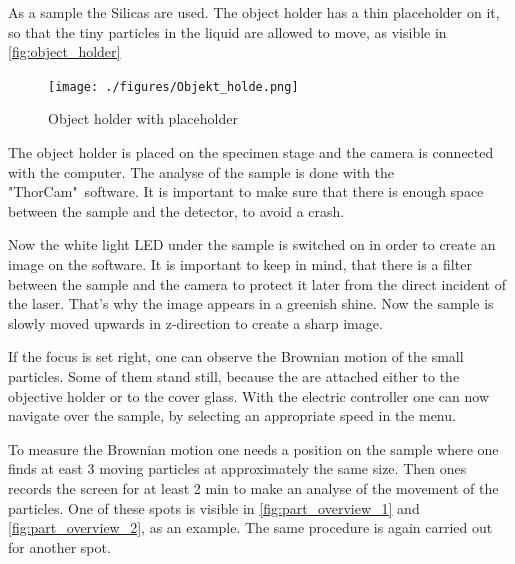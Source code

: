 \documentclass[12pt,english,ngerman]{scrartcl}
\begin{document}
As a sample the Silicas are used. The object holder has a thin placeholder on
it, so that the tiny particles in the liquid are allowed to move, as visible in
\autoref{fig:object_holder}

\begin{figure}[H]
	\begin{center}
		\texttt{[image: ./figures/Objekt\_holde.png]}
	\end{center}
	\caption[Object holder with placeholder] { Object holder with placeholder
	}\label{fig:object_holder}
\end{figure}

The object holder is placed on the specimen stage and the camera is connected
with the computer. The analyse of the sample is done with the "ThorCam"\
software. It is important to make sure that there is enough space between the
sample and the detector, to avoid a crash.

Now the white light LED under the sample is switched on in order to create an
image on the software. It is important to keep in mind, that there is a filter
between the sample and the camera to protect it later from the direct incident
of the laser. That's why the image appears in a greenish shine. Now the sample
is slowly moved upwards in z-direction to create a sharp image.

If the focus is set right, one can observe the Brownian motion of the small
particles. Some of them stand still, because the are attached either to the
objective holder or to the cover glass. With the electric controller one can
now navigate over the sample, by selecting an appropriate speed in the menu.

To measure the Brownian motion one needs a position on the sample where one
finds at east 3 moving particles at approximately the same size. Then ones
records the screen for at least 2 min to make an analyse of the movement of the
particles. One of these spots is visible in \autoref{fig:part_overview_1} and
\autoref{fig:part_overview_2}, as an example. The same procedure is again
carried out for another spot.

\end{document}
